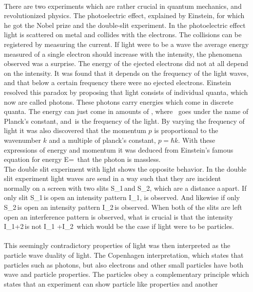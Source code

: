 \\
There are two experiments which are rather crucial in quantum mechanics, and
revolutionized physics.  The photoelectric effect, explained by Einstein,
for which he got the Nobel prize and the double-slit experiment.  In the
photoelectric effect light is scattered on metal and collides with the
electrons. The collisions can be registered by measuring the current. If light
were to be a wave the average energy measured of a single electron should
increase with the intensity, the phenomena observed was a surprise. The energy
of the ejected electrons did not at all depend on the intensity. It was found
that it depends on the frequency of the light waves, and that below a
certain frequency there were no ejected electrons. Einstein resolved this
paradox by proposing that light consists of individual quanta, which now are
called photons. These photons carry energies which come in discrete quanta. The
energy can just come in amounts of \sd \hbar \omega\sd, where \sd \hbar\,\sd
goes under the name of Planck's constant, and \sd\omega\,\sd is the frequency
of the light. By varying the frequency of light it was also discovered that
the momentum $p$ is proportional to the wavenumber $k$ and a multiple of planck's constant, $p=\hbar k$. With these expressions of energy and momentum it was
deduced from Einstein's famous equation for energy \sd E=\sd\, that the photon is massless. \\
The double slit experiment with light shows the opposite behavior. 
In the double slit experiment light waves are send in a way such that
they are incident normally on a screen with two slits \sd S_1\,\sd and \sd
S_2\sd, which are a distance \sd a\,\sd apart. If only slit \sd S_1\,\sd is
open an intensity pattern \sd I_1\sd, is observed. And likewise if only \sd
S_2\,\sd is open an intensity pattern \sd I_2\,\sd is observed. When both of
the slits are left open an interference pattern is observed, what is crucial is
that the intensity \sd I_{1+2}\,\sd is not \sd I_1 +I_2\sd \,  which would be
the case if light were to be particles.\\
\\
This seemingly contradictory properties of light was then interpreted as the
particle wave duality of light. The Copenhagen interpretation, which states
that particles such as photons, but also electrons and other small particles
have both wave and particle properties. The particles obey a complementary principle
which states that an experiment can show particle like properties and another
